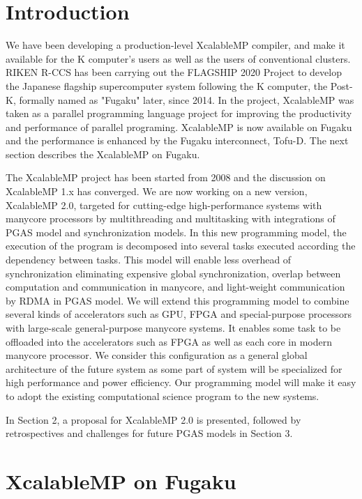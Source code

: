 ﻿\documentclass[graybox]{svmult}
\begin{document}
\section{Introduction}

We have been developing a production-level XcalableMP compiler, and make it available for the K computer’s users as well as the users of conventional clusters.
RIKEN R-CCS has been carrying out the FLAGSHIP 2020 Project\cite{FLAGSHIP2020} to develop the Japanese flagship supercomputer system following the K computer,
the Post-K, formally named as "Fugaku" later, since 2014. 
In the project, 
XcalableMP was taken as a parallel programming language project
for improving the productivity and performance of parallel programing.
XcalableMP is now available on Fugaku and the performance is enhanced by the Fugaku interconnect, Tofu-D. The next section describes the XcalableMP on Fugaku.

The XcalableMP project has been started from 2008 and the discussion on XcalableMP 1.x has converged. We are now working on a new version, XcalableMP 2.0, targeted for cutting-edge high-performance systems with manycore processors by multithreading and multitasking with integrations of PGAS model and synchronization models.
In this new programming model, the execution of the program is decomposed into several tasks executed according the dependency between tasks. This model will enable less overhead of synchronization eliminating expensive global synchronization, overlap between computation and communication in manycore, and light-weight communication by RDMA in PGAS model.
We will extend this programming model to combine several kinds of accelerators such as GPU, FPGA and special-purpose processors with large-scale general-purpose manycore systems. It enables some task to be offloaded into the accelerators such as FPGA as well as each core in modern manycore processor. We consider this configuration as a general global architecture of the future system as some part of system will be specialized for high performance and power efficiency. Our programming model will make it easy to adopt the existing computational science program to the new systems.

In Section 2, a proposal for XcalableMP 2.0 is presented,
followed by retrospectives and challenges for future PGAS models in Section 3.

\section{XcalableMP on Fugaku}
\end{document}
